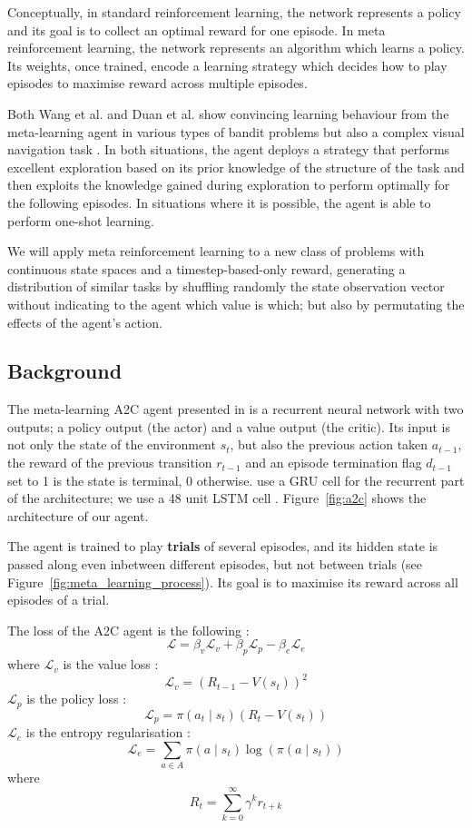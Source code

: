 \documentclass[letterpaper]{article}
\begin{document}
Conceptually, in standard reinforcement learning, the network represents 
a policy and its goal is to collect an optimal reward for one episode. In
meta reinforcement learning, the network represents an algorithm which
learns a policy. Its weights, once trained, encode a learning strategy which
decides how to play episodes to maximise reward across multiple episodes.

Both Wang et al. and Duan et al. show convincing learning behaviour from
the meta-learning agent in various types of bandit problems but also
a complex visual navigation task \citep{learningtonavigate}. In both situations, 
the agent deploys a strategy that performs excellent exploration based on its 
prior knowledge of the structure of the task 
and then exploits the knowledge gained during exploration to perform 
optimally for the following episodes. In situations where it is possible, the
agent is able to perform one-shot learning.

We will apply meta reinforcement learning to a new class of problems with
continuous state spaces and a timestep-based-only reward, generating 
a distribution of similar tasks by shuffling randomly the state observation
vector without indicating to the agent which value is which; but also
by permutating the effects of the agent's action.

\subsection{Background} 
The meta-learning A2C agent presented in \cite{learningtorl} is a recurrent
neural network with two outputs; a policy output (the actor) and a value
output (the critic). Its input is not only the state of the environment $s_t$,
but also the previous action taken $a_{t-1}$, the reward of the previous
transition $r_{t-1}$ and an episode termination flag $d_{t-1}$ set to 1 is the
state is terminal, 0 otherwise. \cite{learningtorl} use a GRU \citep{grus} cell
for the recurrent part of the architecture; we use a 48 unit LSTM cell 
\citep{lstm}. Figure~\ref{fig:a2c} shows the architecture of our agent.

The agent is trained to play \textbf{trials} of several episodes, and its
hidden state is passed along even inbetween different episodes, but not
between trials (see Figure~\ref{fig:meta_learning_process}). Its goal is to 
maximise its reward across all episodes of a trial.

The loss of the A2C agent is the following : 
$$ \mathcal{L} = \beta_v \mathcal{L}_v + \beta_p \mathcal{L}_p - \beta_e 
 \mathcal{L}_e $$
where $\mathcal{L}_v$ is the value loss : 
$$ \mathcal{L}_v = (R_{t-1} - V(s_t))^2$$
$\mathcal{L}_p$ is the policy loss : 
$$ \mathcal{L}_p = \pi(a_t \mid s_t) (R_t - V(s_t))$$
$\mathcal{L}_e$ is the entropy regularisation : 
$$ \mathcal{L}_e = \sum\limits_{a \in A}\pi(a \mid s_t)\log(\pi(a \mid s_t))$$
where 
$$R_t = \sum\limits_{k=0}^{\infty} \gamma^k r_{t+k}$$
\end{document}
